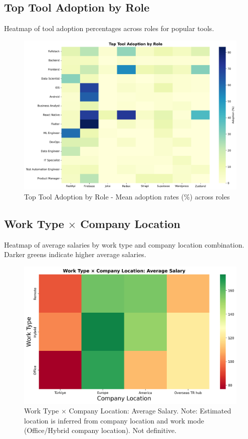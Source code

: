 \documentclass[12pt,a4paper]{article}
\begin{document}
\subsection{Top Tool Adoption by Role}
Heatmap of tool adoption percentages across roles for popular tools.

\begin{figure}[H]
    \centering
    \includegraphics[width=\textwidth]{figures/heatmap_tool_adoption_by_role.png}
    \caption{Top Tool Adoption by Role - Mean adoption rates (\%) across roles}
\end{figure}

\subsection{Work Type \texorpdfstring{\(\times\)}{} Company Location}
Heatmap of average salaries by work type and company location combination. Darker greens indicate higher average salaries.

\begin{figure}[H]
    \centering
    \includegraphics[width=\textwidth]{figures/heatmap_worktype_location_salary.png}
    \caption{Work Type \(\times\) Company Location: Average Salary. Note: Estimated location is inferred from company location and work mode (Office/Hybrid \textrightarrow{} company location). Not definitive.}
\end{figure}
\end{document}
